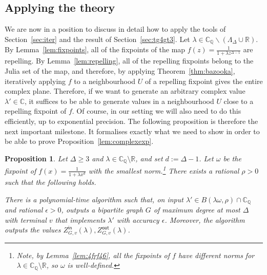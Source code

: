 \documentclass[11pt]{article}
\newtheorem{proposition}[theorem]{Proposition}
\def\Zin{Z^{\mathsf{in}}}
\def\Zout{Z^{\mathsf{out}}}
\def\Reals{\mathbb{R}}
\def\Complex{\mathbb{C}}
\def\CQ{\mathbb{C}_{\mathbb{Q}}}
\def\LambdaD{\Lambda_\Delta}
\begin{document}
\subsection{Applying the theory}\label{sec:vt4vv45665v}
We are now in a position to discuss in  detail   how to apply the tools of Section~\ref{sec:iter} and the result of Section~\ref{sec:tg4gt3}. Let $\lambda\in \CQ\backslash (\LambdaD\cup \Reals)$. By Lemma~\ref{lem:fixpoints}, all of the fixpoints of the map $f(z)=\frac{1}{1+\lambda z^{\Delta-1}}$ are repelling. By Lemma~\ref{lem:repelling}, all of the repelling fixpoints belong to the Julia set of the map, and therefore, by applying Theorem~\ref{thm:bazooka}, iteratively applying $f$ to a neighbourhood $U$ of a repelling fixpoint gives the entire complex plane.  Therefore, if we want to generate an arbitrary complex value $\lambda'\in \Complex$, it suffices to be able to generate values in a neighbourhood $U$ close to a repelling fixpoint of $f$. Of course, in our setting we will also need to do this efficiently, up to exponential precision. The following proposition is therefore the next important milestone. It formalises exactly what we need to show in order to be able to  prove Proposition~\ref{lem:complexexp}.


\newcommand{\statelemmainonetwoone}{
Let $\Delta\geq 3$ and $\lambda\in \CQ\setminus\Reals$, and set $d:=\Delta-1$. Let $\omega$ be the fixpoint of $f(x)=\frac{1}{1+\lambda x^{d}}$ with the smallest norm. There exists a rational $\rho>0$ such that the following holds.

There is a polynomial-time algorithm such that, on input $\lambda'\in B(\lambda\omega,\rho)\cap \CQ$ and rational $\epsilon>0$, outputs a bipartite graph $G$ of maximum degree at most  $\Delta$ with terminal $v$ that implements $\lambda'$ with accuracy $\epsilon$. Moreover, the algorithm outputs the values $\Zin_{G,v}(\lambda),\Zout_{G,v}(\lambda)$.
}
\begin{proposition}\label{lem:main121}
Let $\Delta\geq 3$ and $\lambda\in \CQ\setminus\Reals$, and set $d:=\Delta-1$. Let $\omega$ be the fixpoint of $f(x)=\frac{1}{1+\lambda x^{d}}$ with the smallest norm.\footnote{Note, by Lemma~\ref{lem:4frf46}, all the fixpoints of $f$ have different norms for $\lambda\in \CQ\setminus\Reals$, so $\omega$ is well-defined.} There exists a rational $\rho>0$ such that the following holds.

There is a polynomial-time algorithm such that, on input $\lambda'\in B(\lambda\omega,\rho)\cap \CQ$ and rational $\epsilon>0$, outputs a bipartite graph $G$ of maximum degree at most  $\Delta$ with terminal $v$ that implements $\lambda'$ with accuracy $\epsilon$. Moreover, the algorithm outputs the values $\Zin_{G,v}(\lambda),\Zout_{G,v}(\lambda)$.
\end{proposition}
\end{document}
